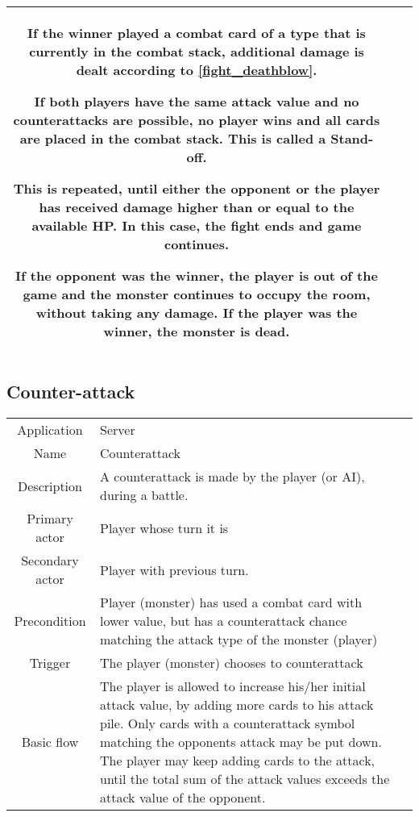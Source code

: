 \begin{tabular}{|c| p{9cm}|c}
If the winner played a combat card of a type that is currently in the combat stack, additional damage is dealt according to \ref{fight_deathblow}.

If both players have the same attack value and no counterattacks are possible, no player wins and all cards are placed in the combat stack. This is called a Stand-off.

This is repeated, until either the opponent or the player has received damage higher than or equal to the available HP. In this case, the fight ends and game continues.

If the opponent was the winner, the player is out of the game and the monster continues to occupy the room, without taking any damage. If the player was the winner, the monster is dead.\\



\hline
\end{tabular}

\subsection{Counter-attack}
\label{fight_counterattack}
\begin{tabular}{|c| p{9cm}|c}
\hline
Application & Server \\
Name & Counterattack \\
Description & A counterattack is made by the player (or AI), during a battle. \\
Primary actor & Player whose turn it is \\
Secondary actor & Player with previous turn.\\
Precondition & Player (monster) has used a combat card with lower value, but has a counterattack chance matching the attack type of the monster (player)\\
Trigger & The player (monster) chooses to counterattack  \\ \hline
Basic flow & The player is allowed to increase his/her initial attack value, by adding more cards to his attack pile. Only cards with a counterattack symbol matching the opponents attack may be put down. The player may keep adding cards to the attack, until the total sum of the attack values exceeds the attack value of the opponent.\\
\hline
\end{tabular}


